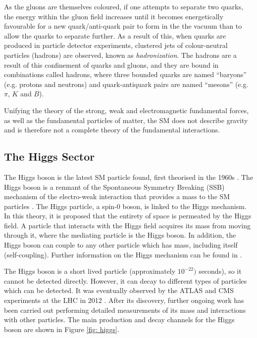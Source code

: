 As the gluons are themselves coloured, if one attempts to separate two quarks, the energy within the gluon field increases until it becomes energetically favourable for a new quark/anti-quark pair to form in the the vacuum than to allow the quarks to separate further. As a result of this, when quarks are produced in particle detector experiments, clustered jets of colour-neutral particles (hadrons) are observed, known as \textit{hadronization}. The hadrons are a result of this confinement of quarks and gluons, and they are bound in combinations called hadrons, where three bounded quarks are named “baryons” (e.g. protons and neutrons) and quark-antiquark pairs are named “mesons” (e.g. $\pi$, $K$ and $B$).

Unifying the theory of the strong, weak and electromagnetic fundamental forces, as well as the fundamental particles of matter, the SM does not describe gravity and is therefore not a complete theory of the fundamental interactions.





\subsection{The Higgs Sector}

The Higgs boson is the latest SM particle found, first theorised in the 1960s \cite{PhysRevLett.13.321, PhysRevLett.13.508, PhysRevLett.13.585}. The Higgs boson is a remnant of the Spontaneous Symmetry Breaking (SSB) mechanism of the electro-weak interaction that provides a mass to the SM particles \cite{doi:10.1098/rsta.2014.0033}. The Higgs particle, a spin-0 boson, is linked to the Higgs mechanism. In this theory, it is proposed that the entirety of space is permeated by the Higgs field. A particle that interacts with the Higgs field acquires its mass from moving through it, where the mediating particle is the Higgs boson. In addition, the Higgs boson can couple to any other particle which has mass, including itself (self-coupling). Further information on the Higgs mechanism can be found in \cite{Bednyakov_2008}. 

The Higgs boson is a short lived particle (approximately $10^{-22})$ seconds), so it cannot be detected directly. However, it can decay to different types of particles which can be detected. It was eventually observed by the ATLAS and CMS experiments at the LHC in 2012 \cite{higgs-20121, higgs-201230}. After its discovery, further ongoing work has been carried out performing detailed measurements of its mass and interactions with other particles. The main production and decay channels for the Higgs boson are shown in Figure \ref{fig: higgs}.

